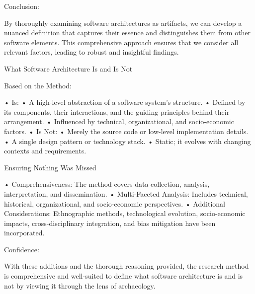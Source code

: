 Conclusion:

By thoroughly examining software architectures as artifacts, we can develop a nuanced definition that captures their essence and distinguishes them from other software elements. This comprehensive approach ensures that we consider all relevant factors, leading to robust and insightful findings.

What Software Architecture Is and Is Not

Based on the Method:

	•	Is:
	•	A high-level abstraction of a software system’s structure.
	•	Defined by its components, their interactions, and the guiding principles behind their arrangement.
	•	Influenced by technical, organizational, and socio-economic factors.
	•	Is Not:
	•	Merely the source code or low-level implementation details.
	•	A single design pattern or technology stack.
	•	Static; it evolves with changing contexts and requirements.

Ensuring Nothing Was Missed

	•	Comprehensiveness: The method covers data collection, analysis, interpretation, and dissemination.
	•	Multi-Faceted Analysis: Includes technical, historical, organizational, and socio-economic perspectives.
	•	Additional Considerations: Ethnographic methods, technological evolution, socio-economic impacts, cross-disciplinary integration, and bias mitigation have been incorporated.

Confidence:

With these additions and the thorough reasoning provided, the research method is comprehensive and well-suited to define what software architecture is and is not by viewing it through the lens of archaeology.